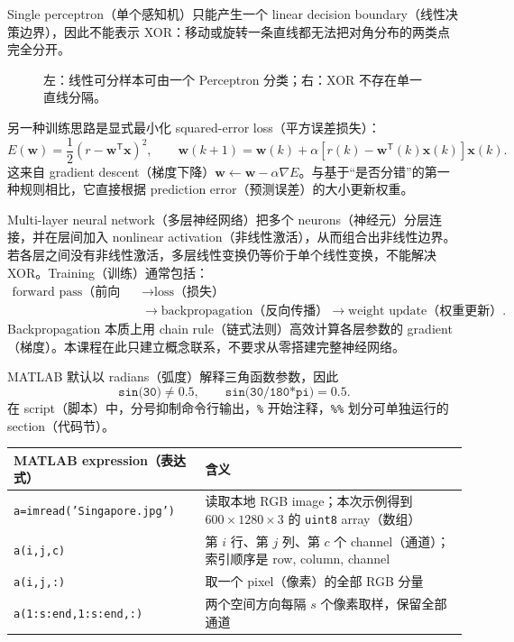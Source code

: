 Single perceptron（单个感知机）只能产生一个 linear decision boundary（线性决策边界），因此不能表示 XOR：移动或旋转一条直线都无法把对角分布的两类点完全分开。

\begin{figure}[htbp]
  \centering
  \resizebox{0.9\textwidth}{!}{}
  \caption{左：线性可分样本可由一个 Perceptron 分类；右：XOR 不存在单一直线分隔。}
  \label{fig:sc4061-l02-perceptron-xor}
\end{figure}

另一种训练思路是显式最小化 squared-error loss（平方误差损失）：
\[
  E(\bm w)=\frac12\left(r-\bm w^{\mathsf T}\bm x\right)^2,
  \qquad
  \boxed{\bm w(k+1)=\bm w(k)+\alpha
  \left[r(k)-\bm w^{\mathsf T}(k)\bm x(k)\right]\bm x(k)}.
\]
这来自 gradient descent（梯度下降）$\bm w\leftarrow\bm w-\alpha\nabla E$。与基于“是否分错”的第一种规则相比，它直接根据 prediction error（预测误差）的大小更新权重。

Multi-layer neural network（多层神经网络）把多个 neurons（神经元）分层连接，并在层间加入 nonlinear activation（非线性激活），从而组合出非线性边界。若各层之间没有非线性激活，多层线性变换仍等价于单个线性变换，不能解决 XOR。Training（训练）通常包括：
\[
\begin{aligned}
  \text{forward pass（前向传播）}
  &\longrightarrow \text{loss（损失）}\\
  &\longrightarrow \text{backpropagation（反向传播）}
  \longrightarrow \text{weight update（权重更新）}.
\end{aligned}
\]
Backpropagation 本质上用 chain rule（链式法则）高效计算各层参数的 gradient（梯度）。本课程在此只建立概念联系，不要求从零搭建完整神经网络。


MATLAB 默认以 radians（弧度）解释三角函数参数，因此
\[
  \texttt{sin(30)}\ne 0.5,
  \qquad
  \texttt{sin(30/180*pi)}=0.5.
\]
在 script（脚本）中，分号抑制命令行输出，\texttt{\%} 开始注释，\texttt{\%\%} 划分可单独运行的 section（代码节）。

\begin{center}
\small
\begin{tabularx}{\textwidth}{@{}lX@{}}
  \toprule
  MATLAB expression（表达式） & 含义 \\
  \midrule
  \texttt{a=imread('Singapore.jpg')} & 读取本地 RGB image；本次示例得到 $600\times1280\times3$ 的 \texttt{uint8} array（数组） \\
  \texttt{a(i,j,c)} & 第 $i$ 行、第 $j$ 列、第 $c$ 个 channel（通道）；索引顺序是 row, column, channel \\
  \texttt{a(i,j,:)} & 取一个 pixel（像素）的全部 RGB 分量 \\
  \texttt{a(1:s:end,1:s:end,:)} & 两个空间方向每隔 $s$ 个像素取样，保留全部通道 \\
  \bottomrule
\end{tabularx}
\end{center}

